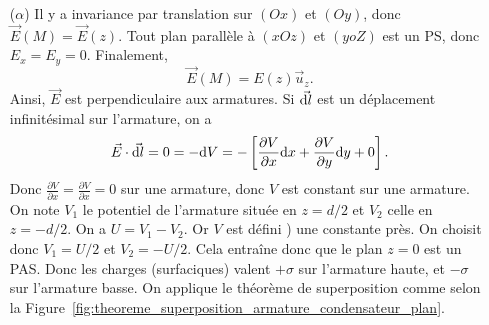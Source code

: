             \begin{enumerate}
                \item [($\alpha$)] Il y a invariance par translation sur $(Ox)$ et $(Oy)$, donc $\vec{E}(M)=\vec{E}(z)$. Tout plan parallèle à $(xOz)$ et $(yoZ)$ est un PS, donc $E_x=E_y=0$. Finalement,
                \begin{equation}
                    \vec{E}(M)=E(z)\vec{u}_z.
                \end{equation}
                Ainsi, $\vec{E}$ est perpendiculaire aux armatures. Si $\vec{\mathrm{d} l}$ est un déplacement infinitésimal sur l'armature, on a 
                \begin{equation}
                    \vec{E}\cdot\vec{\mathrm{d} l}=0=-\mathrm{d} V=-\left[
                        \frac{\partial V}{\partial x}\mathrm{d} x+\frac{\partial V}{\partial y}\mathrm{d} y+0
                    \right].
                \end{equation}
                Donc $\frac{\partial V}{\partial x}=\frac{\partial V}{\partial x}=0$ sur une armature, donc $V$ est constant sur une armature. On note $V_1$ le potentiel de l'armature située en $z=d/2$ et $V_2$ celle en $z=-d/2$. On a $U=V_1-V_2$. Or $V$ est défini ) une constante près. On choisit donc $V_1=U/2$ et $V_2=-U/2$. Cela entraîne donc que le plan $z=0$ est un PAS. Donc les charges (surfaciques) valent $+\sigma$ sur l'armature haute, et $-\sigma$ sur l'armature basse. On applique le théorème de superposition comme selon la Figure~\ref{fig:theoreme_superposition_armature_condensateur_plan}.
                \begin{figure}
                    \centering
\end{figure}
\end{enumerate}
